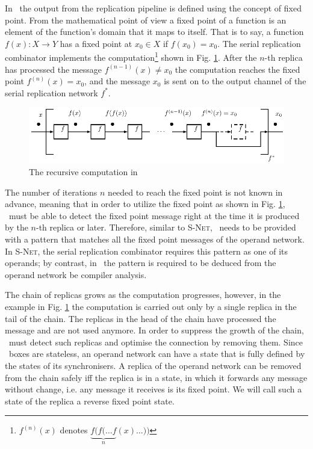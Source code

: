 In \ak\, the output from the replication pipeline is defined using the concept of fixed point. From the mathematical point of view a fixed point of a function is an element of the function's domain that it maps to itself. That is to say, a function $f(x): X \to Y$ has a fixed point at $x_0 \in X$ if $f(x_0) = x_0$. The serial replication combinator implements the computation\footnote{$f^{(n)}(x)$ denotes $\underbrace{f(f(\dots f}_n (x) \dots))$} shown in Fig. \ref{fig:fp}. After the $n$-th replica has processed the message $f^{(n-1)}(x) \neq x_0$ the computation reaches the fixed point $f^{(n)}(x) = x_0$, and the message $x_0$ is sent on to the output channel of the serial replication network $f^{*}$.
\begin{figure}[h!]
\centering
\includegraphics[scale=0.8]{figs/chapter_03_fp.pdf}
\caption{The recursive computation in \ak\ }
\label{fig:fp}
\end{figure}

The number of iterations $n$ needed to reach the fixed point is not known in advance, meaning that in order to utilize the fixed point as shown in Fig. \ref{fig:fp}, \ak\ must be able to detect the fixed point message right at the time it is produced by the $n$-th replica or later. Therefore, similar to \textsc{S-Net}, \ak\ needs to be provided with a pattern that matches all the fixed point messages of the operand network. In \textsc{S-Net}, the serial replication combinator requires this pattern as one of its operands; by contrast, in \ak\ the pattern is required to be deduced from the operand network be compiler analysis.

The chain of replicas grows as the computation progresses, however, in the example in Fig. \ref{fig:fp} the computation is carried out only by a single replica in the tail of the chain. The replicas in the head of the chain have processed the message and are not used anymore. In order to suppress the growth of the chain, \ak\ must detect such replicas and optimise the connection by removing them. Since \ak\ boxes are stateless, an operand network can have a state that is fully defined by the states of its synchronisers. A replica of the operand network can be removed from the chain safely iff the replica is in a state, in which it forwards any message without change, i.e. any message it receives is its fixed point. We will call such a state of the replica a reverse fixed point state.

